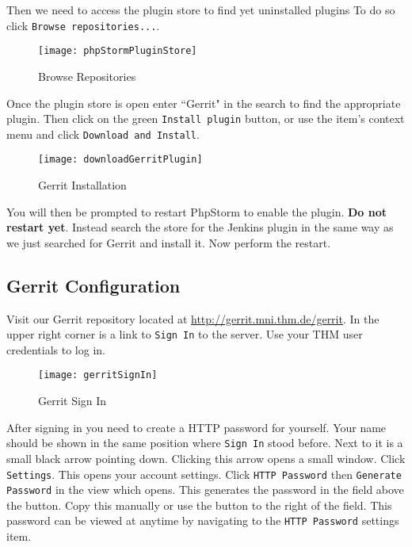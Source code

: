 \newpage

\noindent
Then we need to access the plugin store to find yet uninstalled plugins To do so click \texttt{Browse repositories...}.

\begin{figure}[h]
	\centering
	\texttt{[image: phpStormPluginStore]}
	\caption{Browse Repositories}
	\label{fig:browse-plugin-repositories}
\end{figure}

\noindent
Once the plugin store is open enter ``Gerrit" in the search to find the appropriate plugin. Then click on the green \texttt{Install plugin} button, or use the item's context menu and click \texttt{Download and Install}.

\begin{figure}[h]
	\centering
	\texttt{[image: downloadGerritPlugin]}
	\caption{Gerrit Installation}
	\label{fig:intall-gerrit-plugin}
\end{figure}

\noindent
You will then be prompted to restart PhpStorm to enable the plugin. \textbf{Do not restart yet}. Instead search the store for the Jenkins plugin in the same way as we just searched for Gerrit and install it. Now perform the restart.

\newpage

\subsection{Gerrit Configuration}

Visit our Gerrit repository located at \url{http://gerrit.mni.thm.de/gerrit}. In the upper right corner is a link to \texttt{Sign In} to the server. Use your THM user credentials to log in.

\begin{figure}[h]
	\centering
	\texttt{[image: gerritSignIn]}
	\caption{Gerrit Sign In}
	\label{fig:gerrit-sign-in}
\end{figure}

\noindent
After signing in you need to create a HTTP password for yourself. Your name should be shown in the same position where \texttt{Sign In} stood before. Next to it is a small black arrow pointing down. Clicking this arrow opens a small window. Click \texttt{Settings}. This opens your account settings. Click \texttt{HTTP Password} then \texttt{Generate Password} in the view which opens. This generates the password in the field above the button. Copy this manually or use the button to the right of the field. This password can be viewed at anytime by navigating to the \texttt{HTTP Password} settings item.

